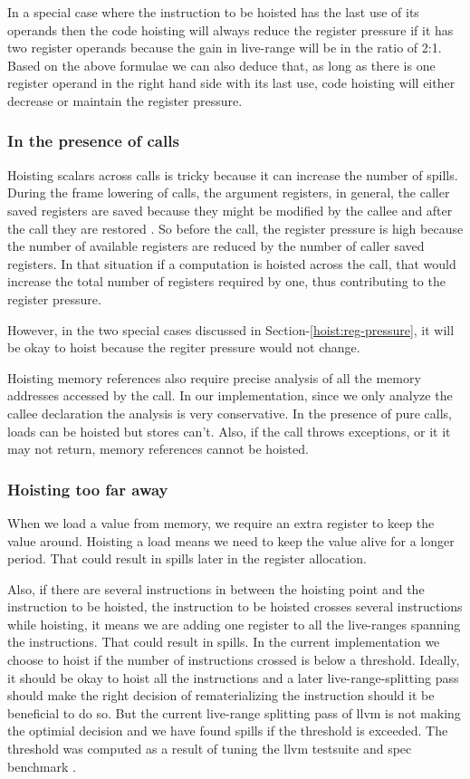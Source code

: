 \documentclass{sig-alternate}
\begin{document}
In a special case where the instruction to be hoisted has the last use of its
operands then the code hoisting will always reduce the register pressure if it
has two register operands because the gain in live-range will be in the ratio of
2:1. Based on the above formulae we can also deduce that, as long as there is
one register operand in the right hand side with its last use, code hoisting
will either decrease or maintain the register pressure.

\subsubsection{In the presence of calls}
\label{cost:across-calls}
Hoisting scalars across calls is tricky because it can increase the number of
spills. During the frame lowering of calls, the argument registers, in general,
the caller saved registers are saved because they might be modified by the
callee and after the call they are restored \cite{frame-lowering}. So before the
call, the register pressure is high because the number of available registers
are reduced by the number of caller saved registers. In that situation if a
computation is hoisted across the call, that would increase the total number of
registers required by one, thus contributing to the register pressure.

However, in the two special cases discussed in Section-\ref{hoist:reg-pressure},
it will be okay to hoist because the regiter pressure would not change.

Hoisting memory references also require precise analysis of all the memory
addresses accessed by the call. In our implementation, since we only analyze the
callee declaration the analysis is very conservative. In the presence of pure
calls, loads can be hoisted but stores can't. Also, if the call throws exceptions,
or it it may not return, memory references cannot be hoisted.

\subsubsection{Hoisting too far away}
When we load a value from memory, we require an extra register to keep the value
around. Hoisting a load means we need to keep the value alive for a longer
period. That could result in spills later in the register allocation.

Also, if there are several instructions in between the hoisting point and the
instruction to be hoisted, the instruction to be hoisted crosses several
instructions while hoisting, it means we are adding one register to all the
live-ranges spanning the instructions. That could result in spills. In the
current implementation we choose to hoist if the number of instructions crossed
is below a threshold. Ideally, it should be okay to hoist all the instructions
and a later live-range-splitting pass should make the right decision of
rematerializing the instruction should it be beneficial to do so. But the
current live-range splitting pass of llvm is not making the optimial decision
and we have found spills if the threshold is exceeded. The threshold was
computed as a result of tuning the llvm testsuite \cite{llvm-nightly} and spec
benchmark \cite{Henning2000}.
\end{document}
